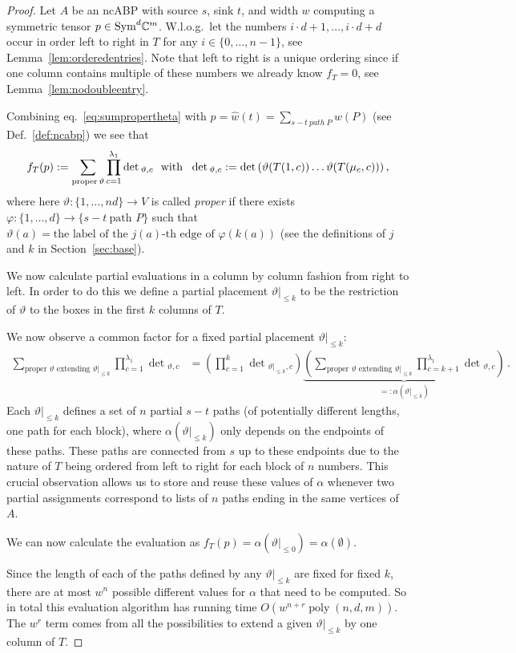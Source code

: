 \documentclass[10pt,a4paper]{article}
\numberwithin{equation}{section}
\theoremstyle{definition}
\newcommand{\Sym}{\textup{Sym}}
\newcommand{\IC}{\mathbb{C}}
\DeclareMathOperator{\poly}{poly}
\begin{document}
\begin{proof}
Let $A$ be an ncABP with source $s$, sink $t$, and width $w$ computing a symmetric tensor $p \in \Sym^d \IC^m$.
W.l.o.g.\ let the numbers $i \cdot d + 1, \ldots, i \cdot d + d$ occur in order left to right in $T$ for any $i \in \{0, \ldots, n-1\}$, see Lemma~\ref{lem:orderedentries}.
%
Note that left to right is a unique ordering since if one column contains multiple of these numbers we already know $f_T = 0$, see Lemma~\ref{lem:nodoubleentry}.

Combining eq.~\eqref{eq:sumpropertheta} with
$
    p = \hat{w}(t) = \sum_{s-t\ path\ P}w(P)
$ (see Def.~\ref{def:ncabp})
we see that
\begin{equation}\label{eq:sumproperthetapaths}
    f_T(p)
    := \sum_{\text{proper\,}\vartheta} \prod_{c = 1}^{\lambda_1}\det{}_{\vartheta, c} \ \text{ with } \ \det{}_{\vartheta, c} := \det\left(\vartheta(T(1, c)) \dots \vartheta(T(\mu_c, c))\right),
\end{equation}
where here $\vartheta:\{1,\ldots,nd\}\to V$ is called \emph{proper} if there exists $\varphi:\{1,\ldots,d\}\to\{s-t\  \text{path } P\}$ such that $\vartheta(a)=\text{the label of the $j(a)$-th edge of } \varphi(k(a))$ (see the definitions of $j$ and $k$ in Section~\ref{sec:base}).

We now calculate partial evaluations in a column by column fashion from right to left.
In order to do this we define a partial placement $\vartheta|_{\leq k}$ to be the restriction of $\vartheta$ to the boxes in the first $k$ columns of $T$.

We now observe a common factor for a fixed partial placement $\vartheta|_{\leq k}$:
\begin{align*}
    \sum_{\text{proper $\vartheta$ extending $\vartheta|_{\leq k}$}}\prod_{c = 1}^{\lambda_1}\det{}_{\vartheta,c}
    &=
    \left(\prod_{c = 1}^{k}\det{}_{\vartheta|_{\leq k},c}\right) \underbrace{\left(\sum_{\text{proper $\vartheta$ extending $\vartheta|_{\leq k}$}}\prod_{c = k+1}^{\lambda_1}\det{}_{\vartheta,c}\right)}_{=:\alpha(\vartheta|_{\leq k})}\,.
\end{align*}
Each $\vartheta|_{\leq k}$ defines a set of $n$ partial $s-t$ paths (of potentially different lengths, one path for each block), where $\alpha(\vartheta|_{\leq k})$ only depends on the endpoints of these paths.
These paths are connected from $s$ up to these endpoints due to the nature of $T$ being ordered from left to right for each block of $n$ numbers.
This crucial observation allows us to store and reuse these values of $\alpha$ whenever two partial assignments correspond to lists of $n$ paths ending in the same vertices of $A$.

We can now calculate the evaluation as $
    f_T(p) = \alpha(\vartheta|_{\leq 0}) = \alpha(\emptyset).
$

Since the length of each of the paths defined by any $\vartheta|_{\leq k}$ are fixed for fixed $k$, there are at most $w^n$ possible different values for $\alpha$ that need to be computed.
So in total this evaluation algorithm has running time $O(w^{n+r} \poly(n,d,m))$.
The $w^{r}$ term comes from all the possibilities to extend a given $\vartheta|_{\leq k}$ by one column of $T$.
\end{proof}
\end{document}
